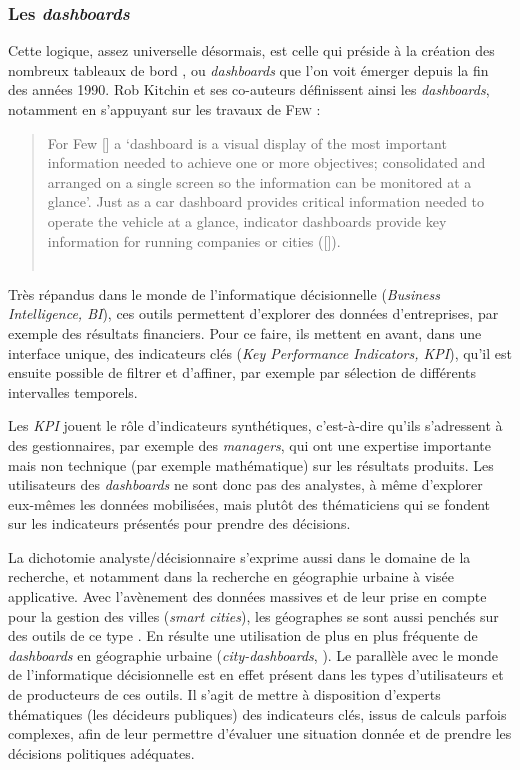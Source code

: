 \subsubsection{Les \textit{dashboards}}

Cette logique, assez universelle désormais, est celle qui préside à la création des nombreux \og tableaux de bord \fg{}, ou \og \textit{dashboards} \fg{} que l'on voit émerger depuis la fin des années 1990.
Rob Kitchin et ses co-auteurs définissent ainsi les \textit{dashboards}, notamment en s'appuyant sur les travaux de \textsc{Few} :

\begin{quotation}
	\og For Few [\autocite[p.34]{few_information_2006}] a ‘dashboard is
	a visual display of the most important information needed to achieve one or more objectives; consolidated and arranged on a single screen so the information can be monitored at a glance’.
	Just as a car dashboard provides critical information needed to operate the vehicle at a glance, indicator dashboards provide key information for running companies or cities ([\cite{rivard_are_2004}]).\fg{}\\
	\mbox{}~ \hfill \cite[p. 11]{kitchin_knowing_2015}
\end{quotation}

Très répandus dans le monde de l'informatique décisionnelle (\textit{Business Intelligence, BI}), ces outils permettent d'explorer des données d'entreprises, par exemple des résultats financiers.
Pour ce faire, ils mettent en avant, dans une interface unique, des indicateurs clés (\textit{Key Performance Indicators, KPI}), qu'il est ensuite possible de filtrer et d'affiner, par exemple par sélection de différents intervalles temporels.

Les \textit{KPI} jouent le rôle d'indicateurs synthétiques, c'est-à-dire qu'ils s'adressent à des gestionnaires, par exemple des \textit{managers}, qui ont une expertise importante mais non technique (par exemple mathématique) sur les résultats produits.
Les utilisateurs des \textit{dashboards} ne sont donc pas des analystes, à même d'explorer eux-mêmes les données mobilisées, mais plutôt des thématiciens qui se fondent sur les indicateurs présentés pour prendre des décisions.

La dichotomie \og analyste/décisionnaire\fg{} s'exprime aussi dans le domaine de la recherche, et notamment dans la recherche en géographie urbaine à visée applicative.
Avec l'avènement des données massives et de leur prise en compte pour la gestion des villes (\textit{smart cities}), les géographes se sont aussi penchés sur des outils de ce type \autocite{laurini_gis_2018}.
En résulte une utilisation de plus en plus fréquente de \textit{dashboards} en géographie urbaine (\og \textit{city-dashboards}\fg{}, \cite{roumpani_creating_2013, kitchin_knowing_2015, batty_perspective_2015}).
Le parallèle avec le monde de l'informatique décisionnelle est en effet présent dans les types d'utilisateurs et de producteurs de ces outils.
Il s'agit de mettre à disposition d'experts thématiques (les décideurs publiques) des indicateurs clés, issus de calculs parfois complexes, afin de leur permettre d'évaluer une situation donnée et de prendre les décisions politiques adéquates.

